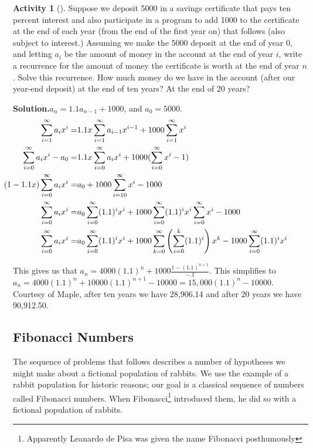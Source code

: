 \documentclass[10pt,]{book}
\theoremstyle{plain}
\theoremstyle{definition}
\newtheorem{activity}[project]{Activity}
\numberwithin{equation}{chapter}
\newcommand{\amp}{&}
\begin{document}
\begin{activity}[]\label{activity-199}
Suppose we deposit \textdollar{}5000 in a savings certificate that pays ten percent interest and also participate in a program to add \textdollar{}1000 to the certificate at the end of each year (from the end of the first year on) that follows (also subject to interest.) Assuming we make the \textdollar{}5000 deposit at the end of year 0, and letting \(a_i\) be the amount of money in the account at the end of year \(i\), write a recurrence for the amount of money the certificate is worth at the end of year \(n\). Solve this recurrence. How much money do we have in the account (after our year-end deposit) at the end of ten years?  At the end of 20 years?%
\par\medskip\noindent%
\textbf{Solution.}\quad \(a_n=1.1a_{n-1}+1000\), and \(a_0=5000\).%
\begin{align*}
\sum_{i=1}^\infty
a_ix^i =\amp 1.1x\sum_{i=1}^\infty a_{i-1}x^{i-1} + 1000\sum_{i=1}^\infty x^i\\
\hspace{-.25 in}\sum_{i=0}^\infty a_ix^i -a_0 =\amp
1.1x\sum_{i=0}^\infty a_ix^i +1000(\sum_{i=0}^\infty x^i-1)\\
\hspace{-.5
in}(1-1.1x)\sum_{i=0}^\infty a_ix^i  =\amp  a_0 +1000\sum_{i=10}^\infty x^i-1000\\
\sum_{i=0}^\infty a_i x^i =\amp  a_0\sum_{i=0}^\infty (1.1)^ix^i
+1000\sum_{i=0}^\infty (1.1)^ix^i\sum_{i=0}^\infty x^i -1000\\
\sum_{i=0}^\infty a_i x^i =\amp  a_0\sum_{i=0}^\infty (1.1)^ix^i
+1000\sum_{k=0}^\infty \left(\sum_{i=0}^k(1.1)^i\right)x^k
- 1000\sum_{i=0}^\infty (1.1)^ix^i
\end{align*}
%
\par
This gives us that \(a_n= 4000(1.1)^n +1000 \frac{1-(1.1)^{n+1}}{-.1}\). This simplifies to \(a_n= 4000(1.1)^n+10000(1.1)^{n+1}-10000 =
15,000(1.1)^n-10000\). Courtesy of Maple, after ten years we have \textdollar{}28,906.14 and after 20 years we have \textdollar{}90,912.50.%
\end{activity}
\typeout{************************************************}
\typeout{************************************************}
\subsection[{Fibonacci Numbers}]{Fibonacci Numbers}\label{subsection-47}
The sequence of problems that follows describes a number of hypotheses we might make about a fictional population of rabbits. We use the example of a rabbit population for historic reasons; our goal is a classical sequence of numbers called Fibonacci numbers. When Fibonacci\footnote{Apparently Leanardo de Pisa was given the name Fibonacci posthumously\label{fn-13}} introduced them, he did so with a fictional population of rabbits.%
\typeout{************************************************}
\typeout{************************************************}
\end{document}
